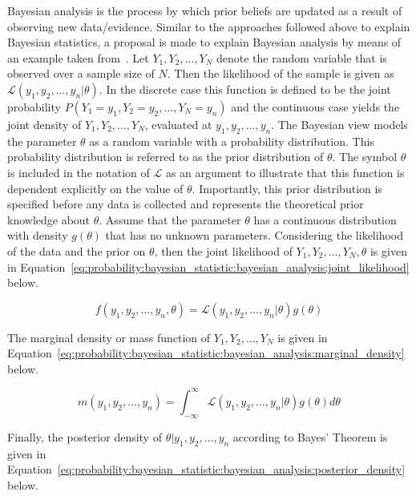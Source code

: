 Bayesian analysis is the process by which prior beliefs are updated as a result of observing new data/evidence. Similar to the approaches followed above to explain Bayesian statistics, a proposal is made to explain Bayesian analysis by means of an example taken from~\cite{ref:wackerly:2014}. Let $Y_{1}, Y_{2}, \dots, Y_{N}$ denote the random variable that is observed over a sample size of $N$. Then the likelihood of the sample is given as $\mathcal{L}(y_{1}, y_{2}, \dots, y_{n} \vert \theta)$. In the discrete case this function is defined to be the joint probability $P(Y_{1} = y_{1}, Y_{2} = y_{2}, \dots, Y_{N} = y_{n})$ and the continuous case yields the joint density of $Y_{1}, Y_{2}, \dots, Y_{N}$, evaluated at $y_{1}, y_{2}, \dots, y_{n}$. The Bayesian view models the parameter $\theta$ as a random variable with a probability distribution. This probability distribution is referred to as the prior distribution of $\theta$. The symbol $\theta$ is included in the notation of $\mathcal{L}$ as an argument to illustrate that this function is dependent explicitly on the value of $\theta$. Importantly, this prior distribution is specified before any data is collected and represents the theoretical prior knowledge about $\theta$. Assume that the parameter $\theta$ has a continuous distribution with density $g(\theta)$ that has no unknown parameters. Considering the likelihood of the data and the prior on $\theta$, then the joint likelihood of $Y_{1}, Y_{2}, \dots, Y_{N}, \theta$ is given in Equation~\eqref{eq:probability:bayesian_statistic:bayesian_analysis:joint_likelihood} below.

\begin{equation}
      \label{eq:probability:bayesian_statistic:bayesian_analysis:joint_likelihood}
      f(y_{1}, y_{2}, \dots, y_{n}, \theta) = \mathcal{L}(y_{1}, y_{2}, \dots, y_{n} \vert \theta)g(\theta)
\end{equation}

The marginal density or mass function of $Y_{1}, Y_{2}, \dots, Y_{N}$ is given in Equation~\eqref{eq:probability:bayesian_statistic:bayesian_analysis:marginal_density} below.

\begin{equation}
      \label{eq:probability:bayesian_statistic:bayesian_analysis:marginal_density}
      m(y_{1}, y_{2}, \dots, y_{n}) = \int_{-\infty}^{\infty} \mathcal{L}(y_{1}, y_{2}, \dots, y_{n} \vert \theta)g(\theta)d\theta
\end{equation}

Finally, the posterior density of $\theta \vert y_{1}, y_{2}, \dots, y_{n}$ according to Bayes' Theorem is given in Equation~\eqref{eq:probability:bayesian_statistic:bayesian_analysis:posterior_density} below.

